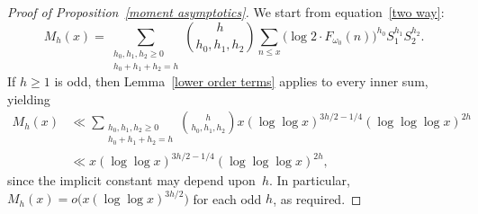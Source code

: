 \documentclass[12pt,reqno]{amsart}
\theoremstyle{definition}
\begin{document}
\begin{proof}[Proof of Proposition~\ref{moment asymptotics}]
We start from equation~\eqref{two way}:
\begin{equation*}
M_h(x) = \sum_{\substack{h_0,h_1,h_2\ge0 \\ h_0+h_1+h_2=h}} \binom h{h_0,h_1,h_2} \sum_{n \leq x} \big( \log 2 \cdot F_{\omega_0}(n) \big)^{h_0} S_1^{h_1}S_2^{h_2}.
\end{equation*}
If $h\ge1$ is odd, then Lemma~\ref{lower order terms} applies to every inner sum, yielding
\begin{align*}
M_h(x) &\ll \sum_{\substack{h_0,h_1,h_2\ge0 \\ h_0+h_1+h_2=h}} \binom h{h_0,h_1,h_2} x(\log\log x)^{3h/2 - 1/4}(\log\log\log x)^{2h} \\
&\ll x(\log\log x)^{3h/2 - 1/4}(\log\log\log x)^{2h},
\end{align*}
since the implicit constant may depend upon~$h$.
In particular, $M_h(x) = o\big( x(\log\log x)^{3h/2} \big)$ for each odd $h$, as required.


\end{proof}
\end{document}
